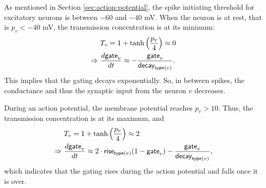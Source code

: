 As mentioned in Section \ref{sec:action-potential}, the spike initiating threshold for excitatory neurons is between $-60$ and $-40$ mV. When the neuron is at rest, that is $p_v < -40$ mV, the transmission concentration is at its minimum:
\begin{gather}
\begin{split}
    & T_v = 1 + \tanh \left( \frac{p_{v}}{4} \right) \approx 0 \\
    \Rightarrow \ & \frac{d\mathsf{gate}_v}{dt} \approx - \frac{\mathsf{gate}_v}{\mathsf{decay}_{\mathsf{type}(v)}}.
\end{split}
\end{gather}
This implies that the gating decays exponentially.
So, in between spikes, the conductance and thus the synaptic input from the neuron $v$ decreases. 

During an action potential, the membrane potential reaches $p_v > 10$. Thus, the transmission concentration is at its maximum, and
\begin{gather}
\begin{split}
    & T_v = 1 + \tanh \left( \frac{p_{v}}{4} \right) \approx 2 \\
    \Rightarrow \ & \frac{d\mathsf{gate}_v}{dt} \approx 2 \cdot \mathsf{rise}_{\mathsf{type}(v)} (1 - \mathsf{gate}_v) - \frac{\mathsf{gate}_v}{\mathsf{decay}_{\mathsf{type}(v)}},
\end{split}
\end{gather}
which indicates that the gating rises during the action potential and falls once it is over. 